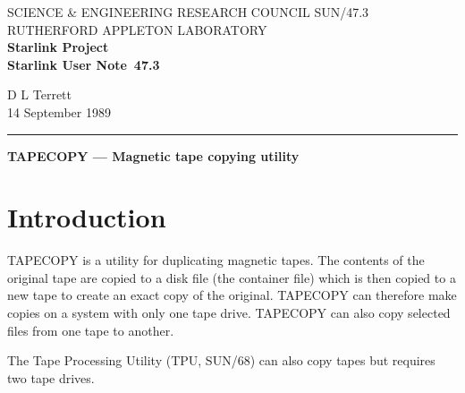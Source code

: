 \pagestyle{myheadings}

\newcommand{\stardoccategory}  {Starlink User Note}
\newcommand{\stardocinitials}  {SUN}
\newcommand{\stardocnumber}    {47.3}
\newcommand{\stardocauthors}   {D L Terrett}
\newcommand{\stardocdate}      {14 September 1989}
\newcommand{\stardoctitle}     {TAPECOPY --- Magnetic tape copying utility}

\newcommand{\stardocname}{\stardocinitials /\stardocnumber}
\markright{\stardocname}
\setlength{\textwidth}{160mm}
\setlength{\textheight}{240mm}
\setlength{\topmargin}{-5mm}
\setlength{\oddsidemargin}{0mm}
\setlength{\evensidemargin}{0mm}
\setlength{\parindent}{0mm}
\setlength{\parskip}{\medskipamount}
\setlength{\unitlength}{1mm}

\renewcommand{\_}{{\tt\char'137}}


\thispagestyle{empty}
SCIENCE \& ENGINEERING RESEARCH COUNCIL \hfill \stardocname\\
RUTHERFORD APPLETON LABORATORY\\
{\large\bf Starlink Project\\}
{\large\bf \stardoccategory\ \stardocnumber}
\begin{flushright}
\stardocauthors\\
\stardocdate
\end{flushright}
\vspace{-4mm}
\rule{\textwidth}{0.5mm}
\vspace{5mm}
\begin{center}
{\Large\bf \stardoctitle}
\end{center}
\vspace{5mm}

\section{Introduction}
TAPECOPY is a utility for duplicating magnetic tapes. The contents of the
original tape are copied to a disk file (the container file) which is then
copied to a new tape to create an exact copy of the original. TAPECOPY can
therefore make copies on a system with only one tape drive. TAPECOPY can also
copy selected files from one tape to another.

The Tape Processing
Utility (TPU, SUN/68) can also copy tapes but requires two tape drives.


